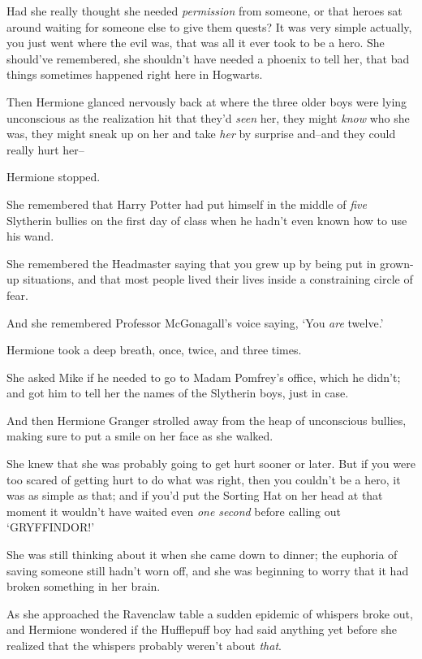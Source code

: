 Had she really thought she needed \emph{permission} from someone, or that heroes sat around waiting for someone else to give them quests? It was very simple actually, you just went where the evil was, that was all it ever took to be a hero. She should've remembered, she shouldn't have needed a phoenix to tell her, that bad things sometimes happened right here in Hogwarts.

Then Hermione glanced nervously back at where the three older boys were lying unconscious as the realization hit that they'd \emph{seen} her, they might \emph{know} who she was, they might sneak up on her and take \emph{her} by surprise and\---and they could really hurt her\---

Hermione stopped.

She remembered that Harry Potter had put himself in the middle of \emph{five} Slytherin bullies on the first day of class when he hadn't even known how to use his wand.

She remembered the Headmaster saying that you grew up by being put in grown-up situations, and that most people lived their lives inside a constraining circle of fear.

And she remembered Professor McGonagall's voice saying, `You \emph{are} twelve.'

Hermione took a deep breath, once, twice, and three times.

She asked Mike if he needed to go to Madam Pomfrey's office, which he didn't; and got him to tell her the names of the Slytherin boys, just in case.

And then Hermione Granger strolled away from the heap of unconscious bullies, making sure to put a smile on her face as she walked.

She knew that she was probably going to get hurt sooner or later. But if you were too scared of getting hurt to do what was right, then you couldn't be a hero, it was as simple as that; and if you'd put the Sorting Hat on her head at that moment it wouldn't have waited even \emph{one second} before calling out `GRYFFINDOR!'

\later

She was still thinking about it when she came down to dinner; the euphoria of saving someone still hadn't worn off, and she was beginning to worry that it had broken something in her brain.

As she approached the Ravenclaw table a sudden epidemic of whispers broke out, and Hermione wondered if the Hufflepuff boy had said anything yet before she realized that the whispers probably weren't about \emph{that}.

